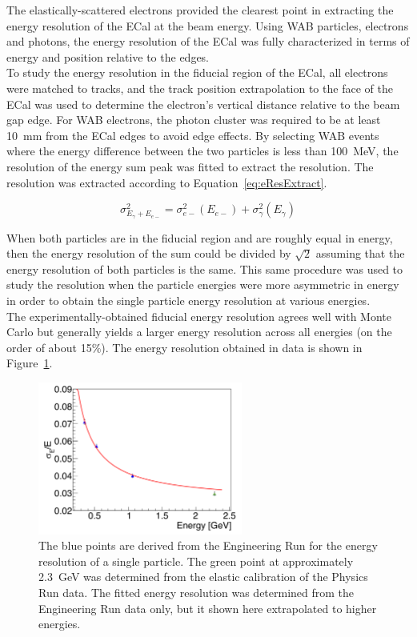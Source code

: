 The elastically-scattered electrons provided the clearest point in extracting the energy resolution of the ECal at the beam energy. Using WAB particles, electrons and photons, the energy resolution of the ECal was fully characterized in terms of energy and position relative to the edges.\\
\indent To study the energy resolution in the fiducial region of the ECal, all electrons were matched to tracks, and the track position extrapolation to the face of the ECal was used to determine the electron's vertical distance relative to the beam gap edge. For WAB electrons, the photon cluster was required to be at least 10~mm from the ECal edges to avoid edge effects. By selecting WAB events where the energy difference between the two particles is less than 100~MeV, the resolution of the energy sum peak was fitted to extract the resolution. The resolution was extracted according to Equation~\eqref{eq:eResExtract}.

\begin{equation}
	\label{eq:eResExtract}
	\sigma_{E_{\gamma}+E_{e-}}^2 = \sigma_{e-}^2(E_{e-})+\sigma_{\gamma}^2(E_{\gamma})
\end{equation}

When both particles are in the fiducial region and are roughly equal in energy, then the energy resolution of the sum could be divided by $\sqrt{2}$ assuming that the energy resolution of both particles is the same. This same procedure was used to study the resolution when the particle energies were more asymmetric in energy in order to obtain the single particle energy resolution at various energies. \\
\indent The experimentally-obtained fiducial energy resolution agrees well with Monte Carlo but generally yields a larger energy resolution across all energies (on the order of about 15$\%$). The energy resolution obtained in data is shown in Figure~\ref{Figure:eResData}.

\begin{figure}[H]
  \centering
      \includegraphics[width=0.6\textwidth]{pics/performance/eResData.png}
  \caption[Energy resolution of the ECal found in data]{The blue points are derived from the Engineering Run for the energy resolution of a single particle. The green point at approximately 2.3~GeV was determined from the elastic calibration of the Physics Run data. The fitted energy resolution was determined from the Engineering Run data only, but it shown here extrapolated to higher energies.}
  \label{Figure:eResData}
\end{figure}

